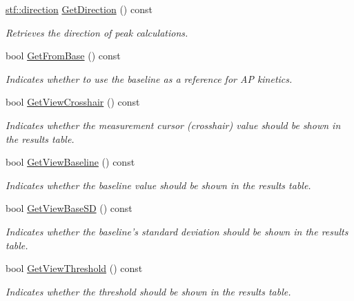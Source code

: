 \begin{DoxyCompactItemize}
\hyperlink{group__stfgen_gae8845ae2aeaf4b742a905a2a5571fd5a}{stf::direction} \hyperlink{classRecording_af72b0104c87d7a0c4a18bdea1a8d8da2}{GetDirection} () const 
\begin{DoxyCompactList}\small\item\em Retrieves the direction of peak calculations. \item\end{DoxyCompactList}\item 
bool \hyperlink{classRecording_a014bb4c39cb99dcc2e1260666074a8e4}{GetFromBase} () const 
\begin{DoxyCompactList}\small\item\em Indicates whether to use the baseline as a reference for AP kinetics. \item\end{DoxyCompactList}\item 
bool \hyperlink{classRecording_a14025db3c94ecdd8dfcb761512ad74e3}{GetViewCrosshair} () const 
\begin{DoxyCompactList}\small\item\em Indicates whether the measurement cursor (crosshair) value should be shown in the results table. \item\end{DoxyCompactList}\item 
bool \hyperlink{classRecording_ac984785dee334420793862355addd1cc}{GetViewBaseline} () const 
\begin{DoxyCompactList}\small\item\em Indicates whether the baseline value should be shown in the results table. \item\end{DoxyCompactList}\item 
bool \hyperlink{classRecording_a083d0924818355e56d0c12ff6c9f00df}{GetViewBaseSD} () const 
\begin{DoxyCompactList}\small\item\em Indicates whether the baseline's standard deviation should be shown in the results table. \item\end{DoxyCompactList}\item 
bool \hyperlink{classRecording_ab0954c4fcf24f32eb286b42307eadd8b}{GetViewThreshold} () const 
\begin{DoxyCompactList}\small\item\em Indicates whether the threshold should be shown in the results table. \item\end{DoxyCompactList}\item 

\end{DoxyCompactItemize}
